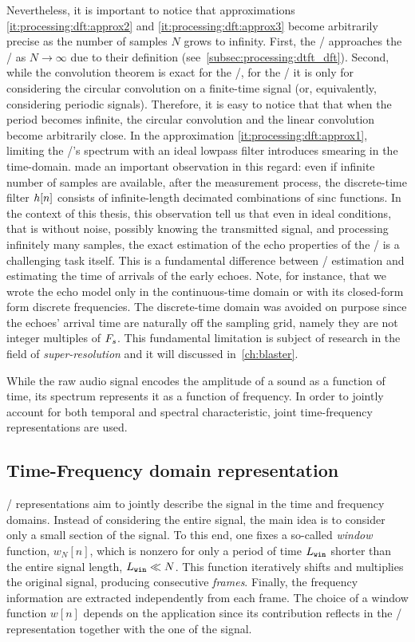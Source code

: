 Nevertheless, it is important to notice that approximations \ref{it:processing:dft:approx2} and \ref{it:processing:dft:approx3} become arbitrarily precise as the number of samples $N$ grows to infinity.
First, the \DFT/ approaches the \DTFT/ as $N\to\infty$ due to their definition (see~\cref{subsec:processing:dtft_dft}).
Second, while the convolution theorem is exact for the \DTFT/, for the \DFT/ it is only for  considering the circular convolution on a finite-time signal (or, equivalently, considering periodic signals).
Therefore, it is easy to notice that that when the period becomes infinite, the circular convolution and the linear convolution become arbitrarily close.
In the approximation \ref{it:processing:dft:approx1}, limiting the \RIR/'s spectrum with an ideal lowpass filter introduces smearing in the time-domain.
\citeauthor{tukuljac2018mulan} made an important observation in this regard:
even if infinite number of samples are available, after the measurement process, the discrete-time filter ${h}[n]$ consists of infinite-length decimated combinations of sinc functions.
In the context of this thesis, this observation tell us that even in ideal conditions, that is without noise, possibly knowing the transmitted signal, and processing infinitely many samples, the exact estimation of the echo properties of the \RIR/ is a challenging task itself.
This is a fundamental difference between \RIR/ estimation and estimating the time of arrivals of the early echoes.
Note, for instance, that we wrote the echo model only in the continuous-time domain or with its closed-form form discrete frequencies.
The discrete-time domain was avoided on purpose since the echoes' arrival time are naturally off the sampling grid, namely they are not integer multiples of $F_s$.
This fundamental limitation is subject of research in the field of \textit{super-resolution} and it will discussed in~\cref{ch:blaster}.

\mynewline
While the raw audio signal encodes the amplitude of a sound as a function of time, its spectrum represents it as a function of frequency.
In order to jointly account for both temporal and spectral characteristic, joint time-frequency representations are used.

\subsection{Time-Frequency domain representation}\label{subsec:processing:stft}
\TFdef/ representations aim to jointly describe the signal in the time and frequency domains.
Instead of considering the entire signal, the main idea is to consider only a small section of the signal.
To this end, one fixes a so-called \textit{window} function, $w_N[n]$, which is nonzero for only a period of time $L_\mathtt{win}$ shorter than the entire signal length, $L_\mathtt{win} \ll N$.
This function iteratively shifts and multiplies the original signal, producing consecutive \textit{frames}.
Finally, the frequency information are extracted independently from each frame.
The choice of a window function $w[n]$ depends on the application since its contribution reflects in the \TF/ representation together with the
one of the signal.

